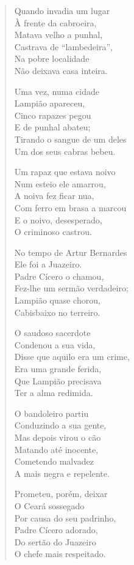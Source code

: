 \begin{verse}
Quando invadia um lugar\\
À frente da cabroeira,\\
Matava velho a punhal,\\
Castrava de “lambedeira”, \\
Na pobre localidade\\
Não deixava casa inteira.

Uma vez, numa cidade\\
Lampião apareceu,\\
Cinco rapazes pegou\\
E de punhal abateu;\\
Tirando o sangue de um deles\\
Um dos seus cabras bebeu.

Um rapaz que estava noivo \\
Num esteio ele amarrou,\\
A noiva fez ficar nua,\\
Com ferro em brasa a marcou\\
E o noivo, desesperado,\\
O criminoso castrou.

No tempo de Artur Bernardes\\
Ele foi a Juazeiro.\\
Padre Cícero o chamou,\\
Fez-lhe um sermão verdadeiro;\\
Lampião quase chorou,\\
Cabisbaixo no terreiro.


O saudoso sacerdote\\
Condenou a sua vida,\\
Disse que aquilo era um crime,\\
Era uma grande ferida,\\
Que Lampião precisava\\
Ter a alma redimida.

O bandoleiro partiu\\
Conduzindo a sua gente,\\
Mas depois virou o cão\\
Matando até inocente,\\
Cometendo malvadez\\
A mais negra e repelente.

Prometeu, porém, deixar\\
O Ceará sossegado\\
Por causa do seu padrinho,\\
Padre Cícero adorado,\\
Do sertão do Juazeiro\\
O chefe mais respeitado.


\end{verse}
